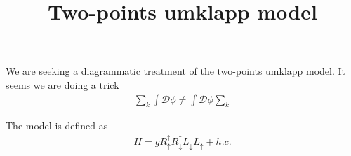 \documentclass[12pt]{article}
\newcommand{\bea}{\begin{eqnarray}}
\newcommand{\eea}{\end{eqnarray}}
\begin{document}
\title{Two-points umklapp model}
\date{}
\maketitle

We are seeking a diagrammatic treatment of the two-points umklapp model. It seems we are doing a trick
\bea \sum_k\int\mathcal{D}\phi \ne \int\mathcal{D}\phi\sum_k \eea

The model is defined as
\bea H=gR_\uparrow^\dag R_\downarrow^\dag L_\downarrow L_\uparrow + h.c. \eea
\end{document}
